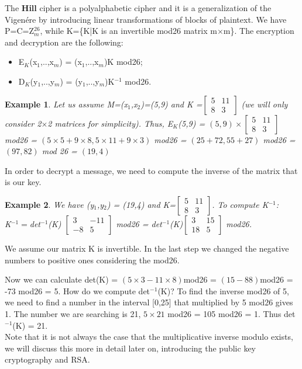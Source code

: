 \documentclass[a4paper, 12pt]{report}
\newtheorem{example}{\textbf{Example}}
\begin{document}
The \textbf{Hill} cipher is a polyalphabetic cipher and it is a generalization of the Vigenére by introducing linear transformations of blocks of plaintext. We have P=C=Z$_m^{26}$, while K=\{K|K is an invertible mod26 matrix m$\times$m\}. The encryption and decryption are the following:
\begin{itemize}
	\item E$_K$(x$_1$,..,x$_m$) = (x$_1$,..,x$_m$)K mod26;
	\item D$_K$(y$_1$,..,y$_m$) = (y$_1$,..,y$_m$)K$^{-1}$ mod26.
\end{itemize}

\begin{example}
	Let us assume M=(x$_1$,x$_2$)=(5,9) and 
		K =$
		\begin{bmatrix}
			5 & 11\\
			8 & 3	
		\end{bmatrix}$
	(we will only consider 2$\times$2 matrices for simplicity). Thus, E$_K$(5,9) = $(5,9)\times
	\begin{bmatrix}
		5 & 11\\
		8 & 3	
	\end{bmatrix}$ mod26 = $(5\times5+9\times8,5\times11+9\times3)$ mod26 = $(25+72,55+27)$ mod26 = $(97,82)$ mod 26 = $(19,4)$
\end{example}

In order to decrypt a message, we need to compute the inverse of the matrix that is our key.
\begin{example}
	We have (y$_1$,y$_2$) = (19,4) and K=$
	\begin{bmatrix}
		5 & 11\\
		8 & 3	
	\end{bmatrix}$. To compute K$^{-1}$:\\
	K$^{-1} = $det$^{-1}$(K) $\begin{bmatrix}
		3 & -11\\
		-8 & 5	
	\end{bmatrix}$ mod26 = det$^{-1}$(K)$
	\begin{bmatrix}
		3 & 15\\
		18 & 5	
	\end{bmatrix}$ mod26.\\
\end{example}

We assume our matrix K is invertible. In the last step we changed the negative numbers to positive ones considering the mod26.

Now we can calculate det(K) = $(5\times3-11\times8)$mod26 = $(15-88)$mod26 = -73 mod26 = 5.
How do we compute det$^{-1}$(K)? To find the inverse mod26 of 5, we need to find a number in the interval [0,25] that multiplied by 5 mod26 gives 1. The number we are searching is 21, $5\times21$ mod26 = 105 mod26 = 1. Thus det$^{-1}$(K) = 21.\\
Note that it is not always the case that the multiplicative inverse modulo exists, we will discuss this more in detail later on, introducing the public key cryptography and RSA.
\end{document}
